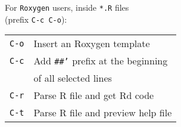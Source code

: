 \documentclass[a4paper]{article}
\newenvironment{tabI}{\begin{tabular}{p{18mm}l}}{\end{tabular}}
\begin{document}
\begin{multicols}{2}
  For \texttt{Roxygen} users, inside \texttt{*.R} files \\ (prefix \texttt{C-c C-o}):
  
  \begin{tabI}
    \texttt{C-o} & Insert an Roxygen template\\
    \texttt{C-c} & Add \texttt{\#\#\rq}  prefix at the beginning \\
                 & of all selected lines\\
    \texttt{C-r} & Parse R file and get Rd code\\
    \texttt{C-t} & Parse R file and preview help file \\
  \end{tabI}

\end{multicols}
\end{document}
